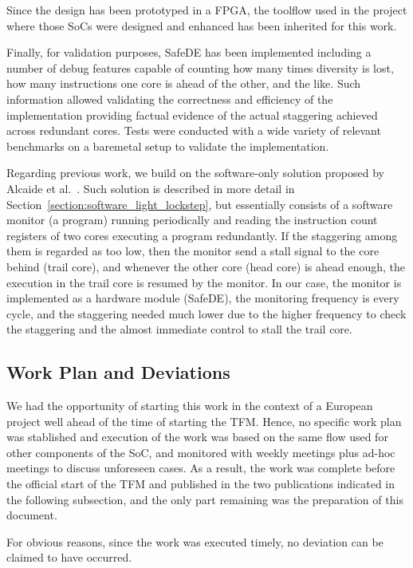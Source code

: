 Since the design has been prototyped in a FPGA, the toolflow used in the project where those SoCs were designed and enhanced has been inherited for this work. 

Finally, for validation purposes, SafeDE has been implemented including a number of debug features capable of counting how many times diversity is lost, how many instructions one core is ahead of the other, and the like. Such information allowed validating the correctness and efficiency of the implementation providing factual evidence of the actual staggering achieved across redundant cores. Tests were conducted with a wide variety of relevant benchmarks on a baremetal setup to validate the implementation.

Regarding previous work, we build on the software-only solution proposed by Alcaide et al.~\cite{alcaide2020software}. Such solution is described in more detail in Section~\ref{section:software_light_lockstep}, but essentially consists of a software monitor (a program) running periodically and reading the instruction count registers of two cores executing a program redundantly. If the staggering among them is regarded as too low, then the monitor send a stall signal to the core behind (trail core), and whenever the other core (head core) is ahead enough, the execution in the trail core is resumed by the monitor. In our case, the monitor is implemented as a hardware module (SafeDE), the monitoring frequency is every cycle, and the staggering needed much lower due to the higher frequency to check the staggering and the almost immediate control to stall the trail core.


\subsection{Work Plan and Deviations}
We had the opportunity of starting this work in the context of a European project well ahead of the time of starting the TFM. Hence, no specific work plan was stablished and execution of the work was based on the same flow used for other components of the SoC, and monitored with weekly meetings plus ad-hoc meetings to discuss unforeseen cases. As a result, the work was complete before the official start of the TFM and published in the two publications indicated in the following subsection, and the only part remaining was the preparation of this document. 

For obvious reasons, since the work was executed timely, no deviation can be claimed to have occurred.


